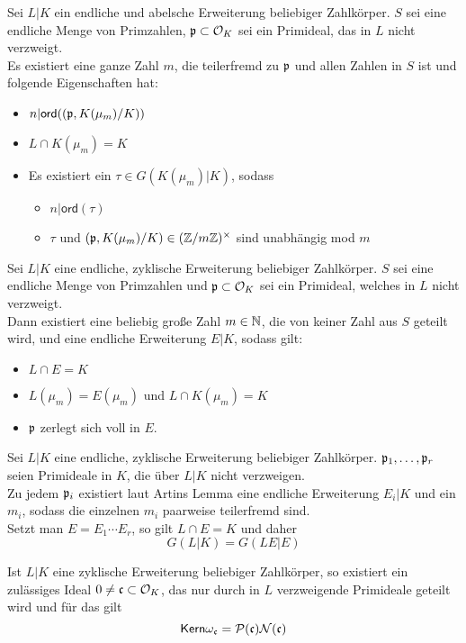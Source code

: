 \Lem{}
Sei $L|K$ ein endliche und abelsche Erweiterung beliebiger Zahlkörper. $S$ sei eine endliche Menge von Primzahlen, $\mathfrak{p} \subset \mathcal{O}_K$ sei ein Primideal, das in $L$ nicht verzweigt.\\
Es existiert eine ganze Zahl $m$, die teilerfremd zu $\mathfrak{p}$ und allen Zahlen in $S$ ist und folgende Eigenschaften hat:
\begin{itemize}
\item $n | \textsf{ord}((\mathfrak{p}, K(\mu_m) / K))$
\item $L\cap K(\mu_m) = K$
\item Es existiert ein $\tau \in G(K(\mu_m) | K)$, sodass
\begin{itemize}
\item $n|\textsf{ord}(\tau)$
\item $\tau$ und $(\mathfrak{p}, K(\mu_m)/K) \in (\mathbb{Z}/m\mathbb{Z})^\times$ sind unabhängig mod $m$
\end{itemize}
\end{itemize} 

Sei $L|K$ eine endliche, zyklische Erweiterung beliebiger Zahlkörper. $S$ sei eine endliche Menge von Primzahlen und $\mathfrak{p} \subset \mathcal{O}_K$ sei ein Primideal, welches in $L$ nicht verzweigt.\\
Dann existiert eine beliebig große Zahl $m \in \mathbb{N}$, die von keiner Zahl aus $S$ geteilt wird, und eine endliche Erweiterung $E|K$, sodass gilt:
\begin{itemize}
\item $L\cap E = K$
\item $L(\mu_m) = E(\mu_m)$ und $L\cap K(\mu_m) = K$
\item $\mathfrak{p}$ zerlegt sich voll in $E$.
\end{itemize} 

\Lem{}
Sei $L|K$ eine endliche, zyklische Erweiterung beliebiger Zahlkörper. $\mathfrak{p}_1,\ldots, \mathfrak{p}_r$ seien Primideale in $K$, die über $L|K$ nicht verzweigen.\\
Zu jedem $\mathfrak{p}_i$ existiert laut Artins Lemma eine endliche Erweiterung $E_i|K$ und ein $m_i$, sodass die einzelnen $m_i$ paarweise teilerfremd sind.\\
Setzt man $E = E_1\cdots E_r$, so gilt $L\cap E = K$ und daher
\[G(L|K) = G(LE|E) \]

\Satz{}
Ist $L|K$ eine zyklische Erweiterung beliebiger Zahlkörper, so existiert ein zulässiges Ideal $0\neq \mathfrak{c} \subset \mathcal{O}_K$, das nur durch in $L$ verzweigende Primideale geteilt wird und für das gilt
\[ \textsf{Kern} \omega_{\mathfrak{c}} = \mathcal{P}(\mathfrak{c}) \mathcal{N}(\mathfrak{c}) \]

